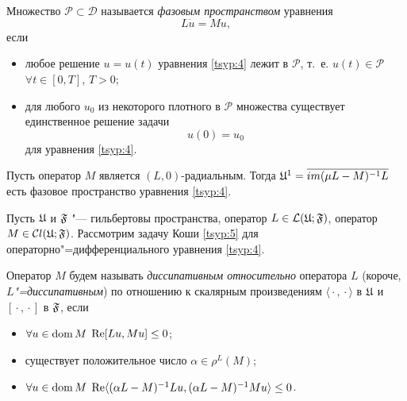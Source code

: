 \smallskip

\begin{definition}[1.4]Множество $\mathcal{P}\subset\mathcal{D}$
называется \emph{фазовым пространством}  уравнения 
\begin{equation}
L\dot{u}=Mu, 
\label{tsyp:4}
\end{equation} 
если
\begin{itemize}
\item[(i)] любое решение $u=u(t)$ уравнения \eqref{tsyp:4} лежит в $\mathcal{P}$,
т.~е. $u(t)\in\mathcal{P}$ $\forall t\in [0,T]$, $T>0$;
\item[(ii)] для любого $u_{0}$ из некоторого плотного в $\mathcal{P}$
множества существует единственное решение задачи
\begin{equation}
u(0)=u_0 
\label{tsyp:5}
\end{equation}
для уравнения \eqref{tsyp:4}.
\end{itemize}
\end{definition}

\smallskip


\begin{theorem}Пусть оператор $M$ является $(L, 0)$-радиальным{\rm .}
Тогда \mbox{$\frak U^{1}= \overline{im(\mu L-M)^{-1}L}$} есть фазовое пространство уравнения \eqref{tsyp:4}{\rm .} 
\end{theorem}

\smallskip

 Пусть $\frak U$ и $\frak F$ "--- гильбертовы  пространства, оператор
$L\in \mathcal L (\frak U;\frak F)$, оператор $M\in \mathcal
Cl (\frak U;\frak F)$. Рассмотрим задачу Коши \eqref{tsyp:5} для
операторно"=дифференциального уравнения \eqref{tsyp:4}.

\smallskip

\begin{definition}[2.1]Оператор $M$ будем называть \emph{диссипативным относительно} оператора $L$ (короче, \emph{$L$"=диссипативным}) по отношению к скалярным произведениям $\langle{}\cdot{}, {}\cdot{}\rangle$ в $\frak U$ и~$[{}\cdot{}, {}\cdot{}]$ в $\frak F$, если
\begin{itemize}
\item[(i)] $\forall u\in \mathop{\rm \mathop{\rm dom}}  M $ $\mathop{\rm Re}[ L u, M u]\leq 0$; 
\item[(ii)] существует положительное число $\alpha \in \rho^{L}(M) $;
\item[(iii)] $\forall u\in \mathop{\rm \mathop{\rm dom}} M $ $\mathop{\rm Re}\langle(\alpha L - M )^{-1} L u,(\alpha L - M )^{-1} M u\rangle\leq 0$.
\end{itemize}
\end{definition}

